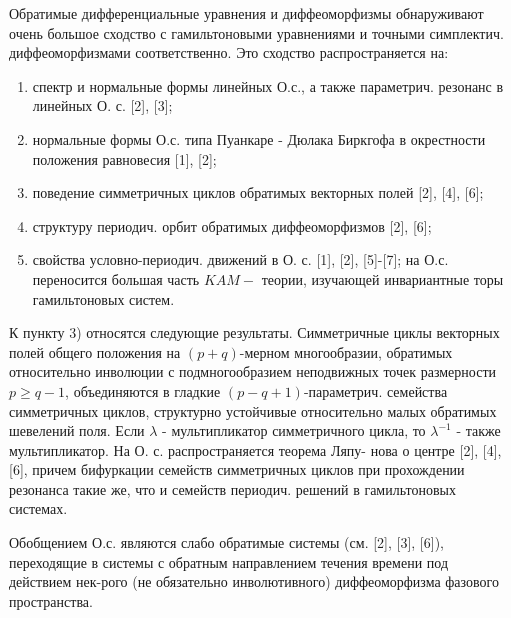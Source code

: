 \documentclass[10pt]{article}
\begin{document}
Обратимые дифференциальные уравнения и диффеоморфизмы обнаруживают очень большое сходство с гамильтоновыми уравнениями и точными симплектич. диффеоморфизмами соответственно. Это сходство распространяется на:



\begin{enumerate}

  \item спектр и нормальные формы линейных О.с., а также параметрич. резонанс в линейных О. с. [2], [3];



  \item нормальные формы О.с. типа Пуанкаре - Дюлака Биркгофа в окрестности положения равновесия [1], [2];



  \item поведение симметричных циклов обратимых векторных полей [2], [4], [6];



  \item структуру периодич. орбит обратимых диффеоморфизмов [2], [6];



  \item свойства условно-периодич. движений в О. с. [1], [2], [5]-[7]; на О.с. переносится большая часть $K A M-$ теории, изучающей инвариантные торы гамильтоновых систем.



\end{enumerate}



К пункту 3) относятся следующие результаты. Симметричные циклы векторных полей общего положения на $(p+q)$-мерном многообразии, обратимых относительно инволюции с подмногообразием неподвижных точек размерности $p \geqslant q-1$, объединяются в гладкие $(p-q+1)$-параметрич. семейства симметричных циклов, структурно устойчивые относительно малых обратимых шевелений поля. Если $\lambda$ - мультипликатор симметричного цикла, то $\lambda^{-1}$ - также мультипликатор. На О. с. распространяется теорема Ляпу- нова о центре [2], [4], [6], причем бифуркации семейств симметричных циклов при прохождении резонанса такие же, что и семейств периодич. решений в гамильтоновых системах.



Обобщением О.с. являются слабо обратимые системы (см. [2], [3], [6]), переходящие в системы с обратным направлением течения времени под действием нек-рого (не обязательно инволютивного) диффеоморфизма фазового пространства.
\end{document}
